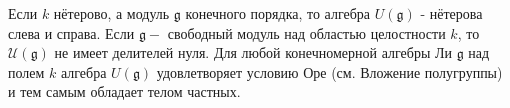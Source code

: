 \documentclass[10pt]{article}
\begin{document}
Если $k$ нётерово, а модуль $\mathfrak{g}$ конечного порядка, то алгебра $U(\mathfrak{g})$ - нётерова слева и справа. Если $\mathfrak{g}-$ свободный модуль над областью целостности $k$, то $\mathscr{U}(\mathfrak{g})$ не имеет делителей нуля. Для любой конечномерной алгебры Ли $\mathfrak{g}$ над полем $k$ алгебра $U(\mathfrak{g})$ удовлетворяет условию Оре (см. Вложение полугруппы) и тем самым обладает телом частных.
\end{document}

